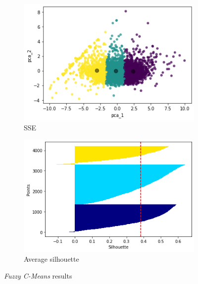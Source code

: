 \begin{figure}[h!]
     \captionsetup{justification=centering}		
     \centering
     \begin{subfigure}{0.39\textwidth}
         \centering
	 \captionsetup{type=figure}
         \includegraphics[width=\textwidth]{img/clustering/clust_fcmeans.png}
         \caption{SSE}
         \label{fig:clust_fcmeans}
     \end{subfigure}
     \begin{subfigure}{0.39\textwidth}
         \centering
         \includegraphics[width=\textwidth]{img/clustering/sil_fcmeans.png}
         \caption{Average silhouette}
         \label{fig:sil_fcmeans}
     \end{subfigure}
     \caption{\emph{Fuzzy C-Means} results}
    \label{fig:fc_means}
\end{figure}


